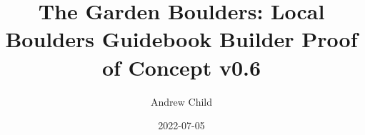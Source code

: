 \documentclass[10pt]{report}
\begin{document}
\title{The Garden Boulders: Local Boulders Guidebook Builder Proof of Concept v0.6}
\author{Andrew Child}
\date{2022-07-05}
\maketitle

\newcommand\chapterColor{MidnightBlue}

\twocolumn
\renewcommand\chapterColor{BrickRed}

\renewcommand\chapterColor{BurntOrange}

\renewcommand\chapterColor{PineGreen}

\renewcommand\chapterColor{RoyalPurple}

\end{document}
